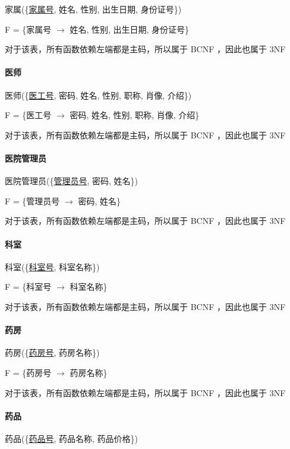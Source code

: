 \documentclass{article}
\begin{document}
家属(\{\underline{家属号}, 姓名, 性别, 出生日期, 身份证号\})

F = \{家属号 $\rightarrow$ 姓名, 性别, 出生日期, 身份证号\}

对于该表，所有函数依赖左端都是主码，所以属于 BCNF ，因此也属于 3NF

\paragraph{医师}

医师(\{\underline{医工号}, 密码, 姓名, 性别, 职称, 肖像, 介绍\})

F = \{医工号 $\rightarrow$ 密码, 姓名, 性别, 职称, 肖像, 介绍\}

对于该表，所有函数依赖左端都是主码，所以属于 BCNF ，因此也属于 3NF

\paragraph{医院管理员}

医院管理员(\{\underline{管理员号}, 密码, 姓名\})

F = \{管理员号 $\rightarrow$ 密码, 姓名\}

对于该表，所有函数依赖左端都是主码，所以属于 BCNF ，因此也属于 3NF

\paragraph{科室}

科室(\{\underline{科室号}, 科室名称\})

F = \{科室号 $\rightarrow$ 科室名称\}

对于该表，所有函数依赖左端都是主码，所以属于 BCNF ，因此也属于 3NF

\paragraph{药房}

药房(\{\underline{药房号}, 药房名称\})

F = \{药房号 $\rightarrow$ 药房名称\}

对于该表，所有函数依赖左端都是主码，所以属于 BCNF ，因此也属于 3NF

\paragraph{药品}

药品(\{\underline{药品号}, 药品名称, 药品价格\})
\end{document}
